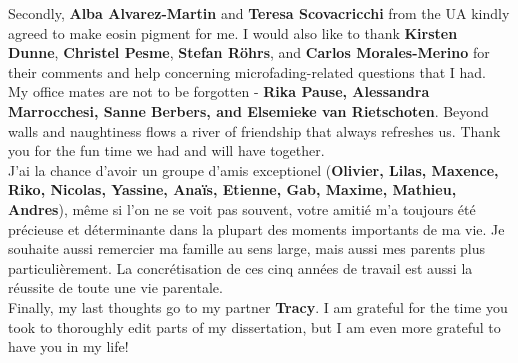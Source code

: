 Secondly, \textbf{Alba Alvarez-Martin} and \textbf{Teresa Scovacricchi} from the \gls{UA} kindly agreed to make eosin pigment for me. I would also like to thank \textbf{Kirsten Dunne}, \textbf{Christel Pesme}, \textbf{Stefan R\"{o}hrs}, and \textbf{Carlos Morales-Merino} for their comments and help concerning microfading-related questions that I had. \\

My office mates are not to be forgotten - \textbf{Rika Pause, Alessandra Marrocchesi, Sanne Berbers, and Elsemieke van Rietschoten}. Beyond walls and naughtiness flows a river of friendship that always refreshes us. Thank you for the fun time we had and will have together.\\

J'ai la chance d'avoir un groupe d'amis exceptionel (\textbf{Olivier, Lilas, Maxence, Riko, Nicolas, Yassine, Anaïs, Etienne, Gab, Maxime, Mathieu, Andres}), même si l'on ne se voit pas souvent, votre amitié m'a toujours été précieuse et déterminante dans la plupart des moments importants de ma vie. Je souhaite aussi remercier ma famille au sens large, mais aussi mes parents plus particulièrement. La concrétisation de ces cinq années de travail est aussi la réussite de toute une vie parentale. \\

Finally, my last thoughts go to my partner \textbf{Tracy}. I am grateful for the time you took to thoroughly edit parts of my dissertation, but I am even more grateful to have you in my life!
